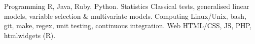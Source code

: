 


\begin{cvskills}

\cvskill
{Programming} %
{R, Java, Ruby, Python.} %
\cvskill
{Statistics} %
{Classical tests, generalised linear models, variable selection \& multivariate models.} %
\cvskill
{Computing} %
{Linux/Unix, bash, git, make, regex, unit testing, continuous integration.} %
\cvskill
{Web} %
{HTML/CSS, JS, PHP, htmlwidgets (R).} %

\end{cvskills}
